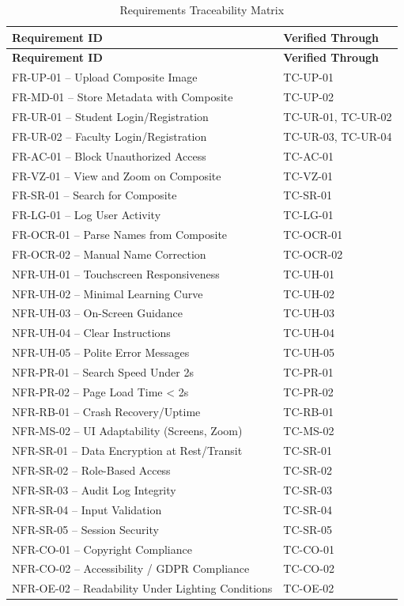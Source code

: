 \documentclass[12pt, titlepage]{article}
\begin{document}
\renewcommand{\arraystretch}{1.3}
\begin{longtable}{|p{4cm}|p{8cm}|}
\caption{Requirements Traceability Matrix} \label{tab:trace} \\
\hline
\textbf{Requirement ID} & \textbf{Verified Through} \\
\hline
\endfirsthead

\hline
\textbf{Requirement ID} & \textbf{Verified Through} \\
\hline
\endhead

FR-UP-01 – Upload Composite Image & TC-UP-01 \\
\hline
FR-MD-01 – Store Metadata with Composite & TC-UP-02 \\
\hline
FR-UR-01 – Student Login/Registration & TC-UR-01, TC-UR-02 \\
\hline
FR-UR-02 – Faculty Login/Registration & TC-UR-03, TC-UR-04 \\
\hline
FR-AC-01 – Block Unauthorized Access & TC-AC-01 \\
\hline
FR-VZ-01 – View and Zoom on Composite & TC-VZ-01 \\
\hline
FR-SR-01 – Search for Composite & TC-SR-01 \\
\hline
FR-LG-01 – Log User Activity & TC-LG-01 \\
\hline
FR-OCR-01 – Parse Names from Composite & TC-OCR-01 \\
\hline
FR-OCR-02 – Manual Name Correction & TC-OCR-02 \\
\hline

NFR-UH-01 – Touchscreen Responsiveness & TC-UH-01 \\
\hline
NFR-UH-02 – Minimal Learning Curve & TC-UH-02 \\
\hline
NFR-UH-03 – On-Screen Guidance & TC-UH-03 \\
\hline
NFR-UH-04 – Clear Instructions & TC-UH-04 \\
\hline
NFR-UH-05 – Polite Error Messages & TC-UH-05 \\
\hline
NFR-PR-01 – Search Speed Under 2s & TC-PR-01 \\
\hline
NFR-PR-02 – Page Load Time < 2s & TC-PR-02 \\
\hline
NFR-RB-01 – Crash Recovery/Uptime & TC-RB-01 \\
\hline
NFR-MS-02 – UI Adaptability (Screens, Zoom) & TC-MS-02 \\
\hline
NFR-SR-01 – Data Encryption at Rest/Transit & TC-SR-01 \\
\hline
NFR-SR-02 – Role-Based Access & TC-SR-02 \\
\hline
NFR-SR-03 – Audit Log Integrity & TC-SR-03 \\
\hline
NFR-SR-04 – Input Validation & TC-SR-04 \\
\hline
NFR-SR-05 – Session Security & TC-SR-05 \\
\hline
NFR-CO-01 – Copyright Compliance & TC-CO-01 \\
\hline
NFR-CO-02 – Accessibility / GDPR Compliance & TC-CO-02 \\
\hline
NFR-OE-02 – Readability Under Lighting Conditions & TC-OE-02 \\
\hline
\end{longtable}
\end{document}
